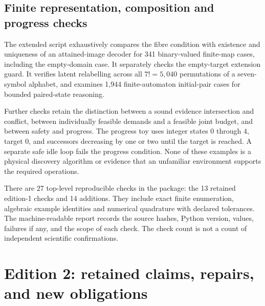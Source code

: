 \documentclass[11pt,a4paper]{article}
\theoremstyle{definition}
\theoremstyle{remark}
\begin{document}
\subsection{Finite representation, composition and progress checks}
The extended script exhaustively compares the fibre condition with existence and uniqueness of an attained-image decoder for 341 binary-valued finite-map cases, including the empty-domain case. It separately checks the empty-target extension guard. It verifies latent relabelling across all $7!=5{,}040$ permutations of a seven-symbol alphabet, and examines 1,944 finite-automaton initial-pair cases for bounded paired-state reasoning.

Further checks retain the distinction between a sound evidence intersection and conflict, between individually feasible demands and a feasible joint budget, and between safety and progress. The progress toy uses integer states $0$ through $4$, target $0$, and successors decreasing by one or two until the target is reached. A separate safe idle loop fails the progress condition. None of these examples is a physical discovery algorithm or evidence that an unfamiliar environment supports the required operations.

There are 27 top-level reproducible checks in the package: the 13 retained edition-1 checks and 14 additions. They include exact finite enumeration, algebraic example identities and numerical quadrature with declared tolerances. The machine-readable report records the source hashes, Python version, values, failures if any, and the scope of each check. The check count is not a count of independent scientific confirmations.


\Needspace{0.36\textheight}
\section{Edition 2: retained claims, repairs, and new obligations}\label{app:edition}
\end{document}
